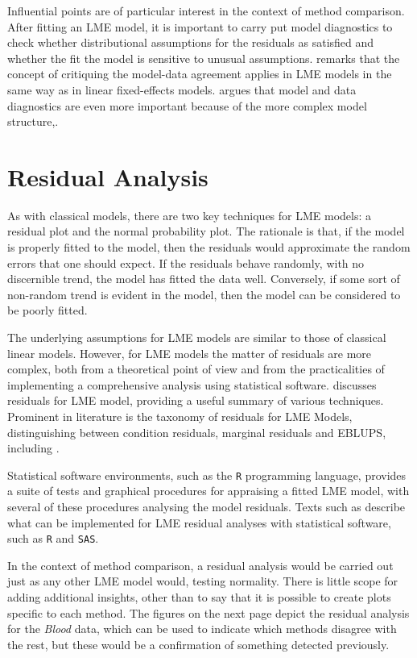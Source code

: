\documentclass[]{report}
\begin{document}
Influential points are of particular interest in the context of method comparison. After fitting an LME model, it is important to carry put model diagnostics to check whether distributional assumptions for the residuals as satisfied and whether the fit the model is sensitive to unusual assumptions. \citet{schabenberger} remarks that the concept of critiquing the model-data agreement applies in LME models in the same way as in linear fixed-effects models. \citet{west} argues that model and data diagnostics are even more important because of the more complex model structure,.





	
\section{Residual Analysis}
As with classical models, there are two key techniques for LME models: a residual plot and the normal probability plot. The rationale is that, if the model is properly fitted to the model, then the residuals would approximate the random errors that one should expect.
If the residuals behave randomly, with no discernible trend, the model has fitted the data well. Conversely, if some sort of non-random trend is evident in the model, then the model can be considered to be poorly fitted. 

The underlying assumptions for LME models are similar to those of classical linear models. However, for LME models the matter of residuals are more complex, both from a theoretical point of view and from the practicalities of implementing a comprehensive analysis using statistical software. \citet{schabenberger} discusses residuals for LME model, providing a useful summary of various techniques. Prominent in literature is the taxonomy of residuals for LME Models, distinguishing between condition residuals, marginal residuals and EBLUPS, including \citet{hildenminton, schabenberger, west, NobreSinger2007}.  

Statistical software environments, such as the \texttt{R} programming language, provides a suite of tests and graphical procedures for appraising a fitted LME model, with several of these procedures analysing the model residuals. Texts such as \citet{PB,west,Galecki} describe what can be implemented for LME residual analyses with statistical software, such as \texttt{R} and \texttt{SAS}.


In the context of method comparison, a residual analysis would be carried out just as any other LME model would, testing normality. There is little scope for adding additional insights, other than to say that it is possible to create plots specific to each method. The figures on the next page depict the residual analysis for the \textit{Blood} data, which can be used to indicate which methods disagree with the rest, but these would be a confirmation of something detected previously.
\end{document}
